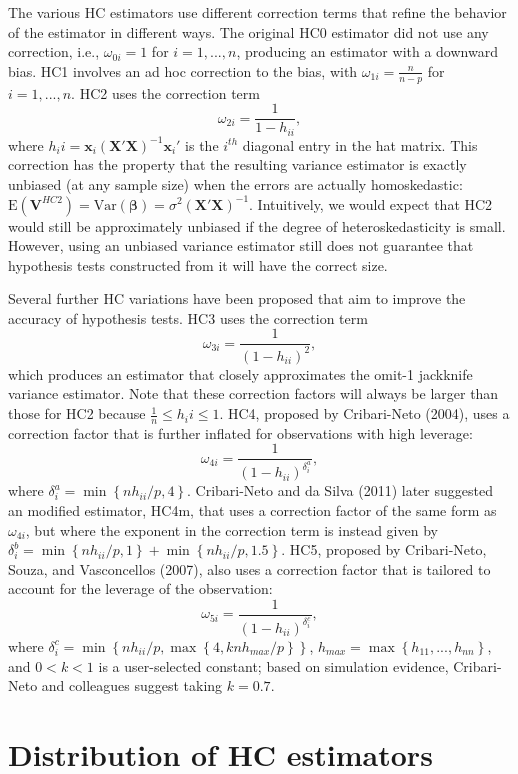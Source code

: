 \documentclass{article}\usepackage[]{graphicx}\usepackage[]{color}
\newcommand{\E}{\text{E}}
\newcommand{\Var}{\text{Var}}
\newcommand{\bm}{\mathbf}
\newcommand{\bs}{\boldsymbol}
\begin{document}
The various HC estimators use different correction terms that refine the behavior of the estimator in different ways. The original HC0 estimator did not use any correction, i.e., $\omega_{0i} = 1$ for $i = 1,...,n$, producing an estimator with a downward bias. HC1 involves an ad hoc correction to the bias, with $\omega_{1i} = \frac{n}{n - p}$ for $i = 1,...,n$. HC2 uses the correction term \[
\omega_{2i} = \frac{1}{1 - h_{ii}}, \]
where $h_ii = \bm{x}_i \left(\bm{X}'\bm{X}\right)^{-1} \bm{x}_i'$ is the $i^{th}$ diagonal entry in the hat matrix. This correction has the property that the resulting variance estimator is exactly unbiased (at any sample size) when the errors are actually homoskedastic: $\E\left(\bm{V}^{HC2}\right) = \Var\left(\bs\beta\right) = \sigma^2\left(\bm{X}'\bm{X}\right)^{-1}$. Intuitively, we would expect that HC2 would still be approximately unbiased if the degree of heteroskedasticity is small. However, using an unbiased variance estimator still does not guarantee that hypothesis tests constructed from it will have the correct size. 

Several further HC variations have been proposed that aim to improve the accuracy of hypothesis tests. HC3 uses the correction term \[
\omega_{3i} = \frac{1}{(1 - h_{ii})^2}, \]
which produces an estimator that closely approximates the omit-1 jackknife variance estimator. Note that these correction factors will always be larger than those for HC2 because $\frac{1}{n} \leq h_ii \leq 1$. HC4, proposed by Cribari-Neto (2004), uses a correction factor that is further inflated for observations with high leverage: \[
\omega_{4i} = \frac{1}{(1 - h_{ii})^{\delta^a_i}}, \]
where $\delta^a_i = \min\left\{n h_{ii} / p, 4 \right\}$. Cribari-Neto and da Silva (2011) later suggested an modified estimator, HC4m, that uses a correction factor of the same form as $\omega_{4i}$, but where the exponent in the correction term is instead given by $\delta^b_i = \min\left\{n h_{ii} / p, 1 \right\} + \min\left\{n h_{ii} / p, 1.5 \right\}$. HC5, proposed by Cribari-Neto, Souza, and Vasconcellos (2007), also uses a correction factor that is tailored to account for the leverage of the observation: \[
\omega_{5i} = \frac{1}{(1 - h_{ii})^{\delta^c_i}}, \]
where $\delta^c_i = \min\left\{n h_{ii} / p, \max \left\{4, k n h_{max} / p\right\}\right\}$, $h_{max} = \max\left\{h_{11},...,h_{nn}\right\}$, and $0 < k < 1$ is a user-selected constant; based on simulation evidence, Cribari-Neto and colleagues suggest taking $k = 0.7$.

\section{Distribution of HC estimators}
\end{document}
